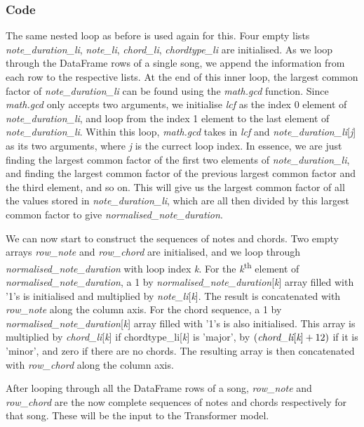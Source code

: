 \subsubsection{Code}
The same nested loop as before is used again for this. Four empty lists \emph{note\_duration\_li}, \emph{note\_li}, \emph{chord\_li}, \emph{chordtype\_li} are initialised. As we loop through the DataFrame rows of a single song, we append the information from each row to the respective lists. At the end of this inner loop, the largest common factor of \emph{note\_duration\_li} can be found using the \emph{math.gcd} function. Since \emph{math.gcd} only accepts two arguments, we initialise \emph{lcf} as the index 0 element of \emph{note\_duration\_li}, and loop from the index 1 element to the last element of \emph{note\_duration\_li}. Within this loop, \emph{math.gcd} takes in \emph{lcf} and \emph{note\_duration\_li}[\emph{j}] as its two arguments, where \emph{j} is the currect loop index. In essence, we are just finding the largest common factor of the first two elements of \emph{note\_duration\_li}, and finding the largest common factor of the previous largest common factor and the third element, and so on. This will give us the largest common factor of all the values stored in \emph{note\_duration\_li}, which are all then divided by this largest common factor to give \emph{normalised\_note\_duration}.

We can now start to construct the sequences of notes and chords. Two empty arrays \emph{row\_note} and \emph{row\_chord} are initialised, and we loop through \emph{normalised\_note\_duration} with loop index \emph{k}. For the \emph{k}\textsuperscript{th} element of \emph{normalised\_note\_duration}, a 1 by \emph{normalised\_note\_duration}[\emph{k}] array filled with '1's is initialised and multiplied by \emph{note\_li}[\emph{k}]. The result is concatenated with \emph{row\_note} along the column axis. For the chord sequence, a 1 by \emph{normalised\_note\_duration}[\emph{k}] array filled with '1's is also initialised. This array is multiplied by \emph{chord\_li}[\emph{k}] if chordtype\_li[\emph{k}] is 'major', by $(\emph{chord\_li}[\emph{k}] + 12)$ if it is 'minor', and zero if there are no chords. The resulting array is then concatenated with \emph{row\_chord} along the column axis.

After looping through all the DataFrame rows of a song, \emph{row\_note} and \emph{row\_chord} are the now complete sequences of notes and chords respectively for that song. These will be the input to the Transformer model.

